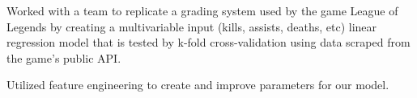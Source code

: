 \documentclass[]{deedy-resume-openfont}
\begin{document}
\begin{minipage}[t]{0.66\textwidth}
\begin{tightemize}
\item Worked with a team to replicate a grading system used by the game League of Legends by creating a multivariable input (kills, assists, deaths, etc) linear regression model that is tested by k-fold cross-validation using data scraped from the game's public API.
\item Utilized feature engineering to create and improve parameters for our model.
\end{tightemize}
\sectionsep





%

\end{minipage} 
\end{document}
